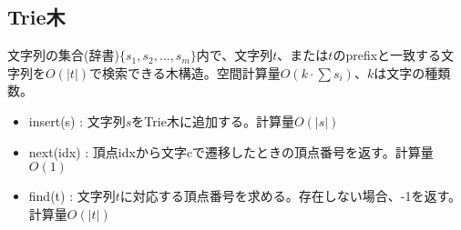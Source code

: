 \subsection{Trie木}

文字列の集合(辞書)$\{s_1, s_2, \ldots, s_m \}$内で、文字列$t$、または$t$のprefixと一致する文字列を$O(|t|)$で検索できる木構造。空間計算量$O(k \cdot \sum{s_i})$、$k$は文字の種類数。

\begin{itemize}
    \item insert(s) : 文字列$s$をTrie木に追加する。計算量$O(|s|)$
    \item next(idx) : 頂点idxから文字cで遷移したときの頂点番号を返す。計算量$O(1)$
    \item find(t) : 文字列$t$に対応する頂点番号を求める。存在しない場合、-1を返す。計算量$O(|t|)$
\end{itemize}

